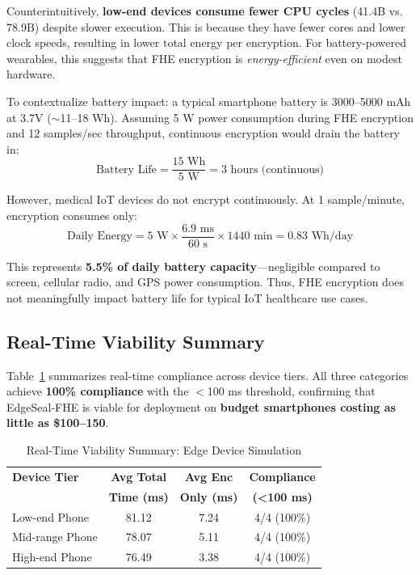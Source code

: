 Counterintuitively, \textbf{low-end devices consume fewer CPU cycles} (41.4B vs. 78.9B) despite slower execution. This is because they have fewer cores and lower clock speeds, resulting in lower total energy per encryption. For battery-powered wearables, this suggests that FHE encryption is \textit{energy-efficient} even on modest hardware.

To contextualize battery impact: a typical smartphone battery is 3000--5000 mAh at 3.7V ($\sim$11--18 Wh). Assuming 5 W power consumption during FHE encryption and 12 samples/sec throughput, continuous encryption would drain the battery in:
\[
\text{Battery Life} = \frac{15 \text{ Wh}}{5 \text{ W}} = 3 \text{ hours (continuous)}
\]

However, medical IoT devices do not encrypt continuously. At 1 sample/minute, encryption consumes only:
\[
\text{Daily Energy} = 5 \text{ W} \times \frac{6.9 \text{ ms}}{60 \text{ s}} \times 1440 \text{ min} = 0.83 \text{ Wh/day}
\]

This represents \textbf{5.5\% of daily battery capacity}---negligible compared to screen, cellular radio, and GPS power consumption. Thus, FHE encryption does not meaningfully impact battery life for typical IoT healthcare use cases.

\subsection{Real-Time Viability Summary}

Table~\ref{tab:edge-viability-summary} summarizes real-time compliance across device tiers. All three categories achieve \textbf{100\% compliance} with the $<$100 ms threshold, confirming that EdgeSeal-FHE is viable for deployment on \textbf{budget smartphones costing as little as \$100--150}.

\begin{table}[!t]
\caption{Real-Time Viability Summary: Edge Device Simulation}
\label{tab:edge-viability-summary}
\centering
\begin{tabular}{|l|c|c|c|}
\hline
\textbf{Device Tier} & \textbf{Avg Total} & \textbf{Avg Enc} & \textbf{Compliance} \\
& \textbf{Time (ms)} & \textbf{Only (ms)} & \textbf{(<100 ms)} \\
\hline
Low-end Phone & 81.12 & 7.24 & 4/4 (100\%) \\
\hline
Mid-range Phone & 78.07 & 5.11 & 4/4 (100\%) \\
\hline
High-end Phone & 76.49 & 3.38 & 4/4 (100\%) \\
\hline
\end{tabular}
\end{table}

